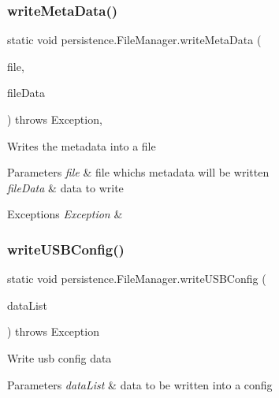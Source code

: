 \subsubsection{\texorpdfstring{write\+Meta\+Data()}{writeMetaData()}}
{\footnotesize\ttfamily static void persistence.\+File\+Manager.\+write\+Meta\+Data (\begin{DoxyParamCaption}\item[{File}]{file,  }\item[{\mbox{\hyperlink{classpersistence_1_1_meta_data}{Meta\+Data}}}]{file\+Data }\end{DoxyParamCaption}) throws Exception\hspace{0.3cm}{\ttfamily [static]}, {\ttfamily [private]}}

Writes the metadata into a file 
\begin{DoxyParams}{Parameters}
{\em file} & file whichs metadata will be written \\
\hline
{\em file\+Data} & data to write \\
\hline
\end{DoxyParams}

\begin{DoxyExceptions}{Exceptions}
{\em Exception} & \\
\hline
\end{DoxyExceptions}
\mbox{\label{classpersistence_1_1_file_manager_a0d94f3c5d697af23544d161541eaed0f}} 
\subsubsection{\texorpdfstring{write\+U\+S\+B\+Config()}{writeUSBConfig()}}
{\footnotesize\ttfamily static void persistence.\+File\+Manager.\+write\+U\+S\+B\+Config (\begin{DoxyParamCaption}\item[{List$<$ \mbox{\hyperlink{classpersistence_1_1_u_s_b_meta_data}{U\+S\+B\+Meta\+Data}} $>$}]{data\+List }\end{DoxyParamCaption}) throws Exception\hspace{0.3cm}{\ttfamily [static]}}

Write usb config data 
\begin{DoxyParams}{Parameters}
{\em data\+List} & data to be written into a config \\
\hline
\end{DoxyParams}


